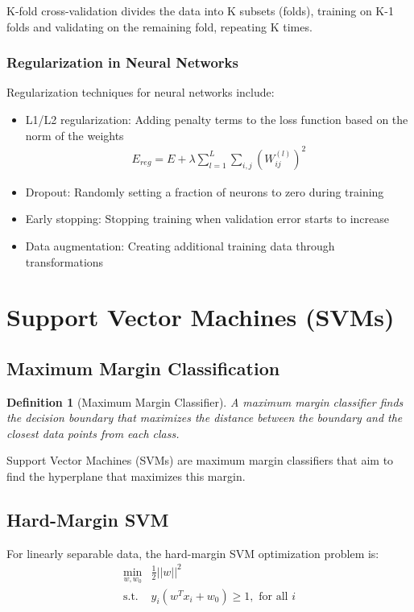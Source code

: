 \documentclass{article}
\newtheorem{definition}{Definition}
\begin{document}
K-fold cross-validation divides the data into K subsets (folds), training on K-1 folds and validating on the remaining fold, repeating K times.

\subsubsection{Regularization in Neural Networks}
Regularization techniques for neural networks include:
\begin{itemize}
\item L1/L2 regularization: Adding penalty terms to the loss function based on the norm of the weights
\begin{align}
E_{reg} = E + \lambda\sum_{l=1}^{L}\sum_{i,j}(W_{ij}^{(l)})^2
\end{align}
\item Dropout: Randomly setting a fraction of neurons to zero during training
\item Early stopping: Stopping training when validation error starts to increase
\item Data augmentation: Creating additional training data through transformations
\end{itemize}

\section{Support Vector Machines (SVMs)}

\subsection{Maximum Margin Classification}
\begin{definition}[Maximum Margin Classifier]
A maximum margin classifier finds the decision boundary that maximizes the distance between the boundary and the closest data points from each class.
\end{definition}

Support Vector Machines (SVMs) are maximum margin classifiers that aim to find the hyperplane that maximizes this margin.

\subsection{Hard-Margin SVM}
For linearly separable data, the hard-margin SVM optimization problem is:
\begin{align}
\min_{w, w_0} &\frac{1}{2}||w||^2\\
\text{s.t. } &y_i(w^Tx_i + w_0) \geq 1, \text{ for all } i
\end{align}
\end{document}
